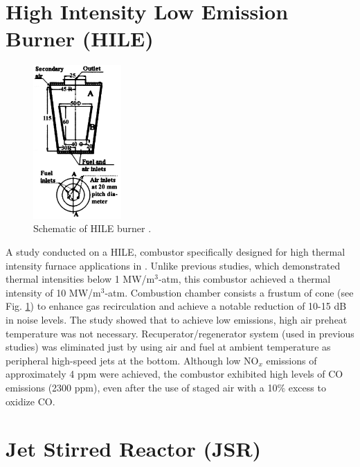 \section{High Intensity Low Emission Burner (HILE)}

\begin{figure}
\vspace{-12mm}
    \centering
    \includegraphics[width=0.3\textwidth]{Chapter2/Images/HILE.png}
  \caption[Schematic of HILE burner]{Schematic of HILE burner \cite{KUMAR20021131}.}
  \label{fig:HILE}
\end{figure}

A study conducted on a HILE, combustor specifically designed for high thermal intensity furnace applications in \cite{KUMAR20021131}. Unlike previous studies, which demonstrated thermal intensities below 1 MW/m$^3$-atm, this combustor achieved a thermal intensity of 10 MW/m$^3$-atm\cite{doi:10.1021/ef402357t}. Combustion chamber consists a frustum of cone  (see Fig. \ref{fig:HILE}) to enhance gas recirculation and achieve a notable reduction of 10-15 dB in noise levels. The study showed that to achieve low emissions, high air preheat temperature was not necessary. Recuperator/regenerator system (used in previous studies) was eliminated just by using air and fuel at ambient temperature as peripheral high-speed jets at the bottom\cite{doi:10.1021/ef402357t}. Although low NO$_x$ emissions of approximately 4 ppm were achieved, the combustor exhibited high levels of CO emissions (2300 ppm), even after the use of staged air with a 10$\%$ excess to oxidize CO.

\section{Jet Stirred Reactor (JSR)}

